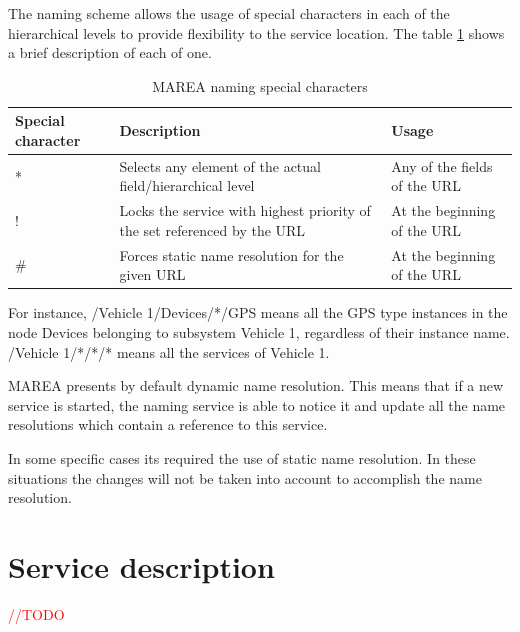 The naming scheme allows the usage of special characters in each of the hierarchical levels to provide flexibility to the service location. The table \ref{T:Marea-Naming-Char} shows a brief description of each of one.

\begin{table}[H]
\begin{center}
\caption{\nohyphens{MAREA naming special characters}}
\label{T:Marea-Naming-Char}
\begin{tabular}{|l|p{7.3cm}|l|}
\hline
 {\bf Special character} & {\bf Description} & {\bf Usage} 										\\ \hline \hline
 * & Selects any element of the actual field/hierarchical level & Any of the fields of the URL\\ \hline
 ! & Locks the service with highest priority of the set referenced by the URL & At the beginning of the URL\\ \hline
 \# & Forces static name resolution for the given URL & At the beginning of the URL \\ \hline
\end{tabular}
\end{center}
\end{table}

For instance, /Vehicle 1/Devices/*/GPS means all the GPS type instances in the node Devices belonging to subsystem Vehicle 1, regardless of their instance name. /Vehicle 1/*/*/* means all the services of Vehicle 1.

MAREA presents by default dynamic name resolution. This means that if a new service is started, the naming service is able to notice it and update all the name resolutions which contain a reference to this service.

In some specific cases its required the use of static name resolution. In these situations the changes will not be taken into account to accomplish the name resolution.

\section{Service description}\label{S:MAREA-services}

\textcolor{red}{//TODO}